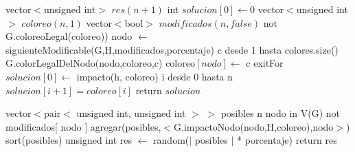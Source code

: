 







\begin{algorithm}[H]
\caption{} 
\begin{codebox}

\li vector$<$unsigned int$>$ $res(n+1)$
\li int $solucion[0] \gets 0$
\li vector$<$unsigned int$>$ $coloreo(n,1)$
\li vector$<$bool$>$ $modificados(n,false)$
\li \While not G.coloreoLegal(coloreo)) \Do
\li nodo $ \gets $ siguienteModificable(G,H,modificados,porcentaje)
\li \For c desde 1 hasta colores.size() \Do
\li \If G.colorLegalDelNodo(nodo,coloreo,c)
\li coloreo$ [nodo] \gets $ c
\li exitFor
\End
\End
\End
\li $solucion[0] \gets$ impacto(h, coloreo)
\li \For i desde 0 hasta n \Do
		\li $solucion[i+1]=coloreo[i]$
	\End
\li	return $solucion$
\End
\end{codebox}
\end{algorithm}


\begin{algorithm}[H]
\caption{} 
\begin{codebox}

\li vector$<$pair$<$ unsigned int, unsigned int $>$ $>$ posibles
\li \For n nodo in V(G) \Do
\li \If not modificados$ [ $ nodo $ ] $
\li    agregar(posibles,$<$G.impactoNodo(nodo,H,coloreo),nodo$>$)
\End
\End
\li
\li sort(posibles)
\li
\li unsigned int res $ \gets $ random($ \vert $ posibles  $ \vert $ * porcentaje)
\li
\li return res
\End
\end{codebox}
\end{algorithm}


